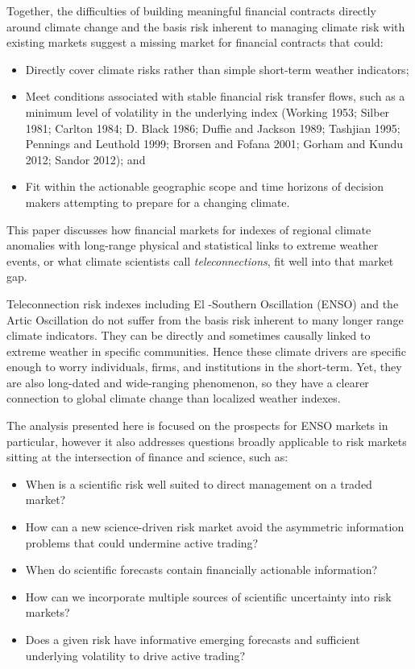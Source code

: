 \documentclass[article]{jss}
\begin{document}
Together, the difficulties of building meaningful financial contracts
directly around climate change and the basis risk inherent to managing
climate risk with existing markets suggest a missing market for
financial contracts that could:

\begin{itemize}
\itemsep1pt\parskip0pt
\item
  Directly cover climate risks rather than simple short-term weather
  indicators;
\item
  Meet conditions associated with stable financial risk transfer flows,
  such as a minimum level of volatility in the underlying index (Working
  1953; Silber 1981; Carlton 1984; D. Black 1986; Duffie and Jackson
  1989; Tashjian 1995; Pennings and Leuthold 1999; Brorsen and Fofana
  2001; Gorham and Kundu 2012; Sandor 2012); and
\item
  Fit within the actionable geographic scope and time horizons of
  decision makers attempting to prepare for a changing climate.
\end{itemize}

This paper discusses how financial markets for indexes of regional
climate anomalies with long-range physical and statistical links to
extreme weather events, or what climate scientists call
\emph{teleconnections}, fit well into that market gap.

Teleconnection risk indexes including El -Southern
Oscillation (ENSO) and the Artic Oscillation do not suffer from the
basis risk inherent to many longer range climate indicators. They can be
directly and sometimes causally linked to extreme weather in specific
communities. Hence these climate drivers are specific enough to worry
individuals, firms, and institutions in the short-term. Yet, they are
also long-dated and wide-ranging phenomenon, so they have a clearer
connection to global climate change than localized weather indexes.

The analysis presented here is focused on the prospects for ENSO markets
in particular, however it also addresses questions broadly applicable to
risk markets sitting at the intersection of finance and science, such
as:

\begin{itemize}
\itemsep1pt\parskip0pt
\item
  When is a scientific risk well suited to direct management on a traded
  market?
\item
  How can a new science-driven risk market avoid the asymmetric
  information problems that could undermine active trading?
\item
  When do scientific forecasts contain financially actionable
  information?
\item
  How can we incorporate multiple sources of scientific uncertainty into
  risk markets?
\item
  Does a given risk have informative emerging forecasts and sufficient
  underlying volatility to drive active trading?
\end{itemize}
\end{document}
